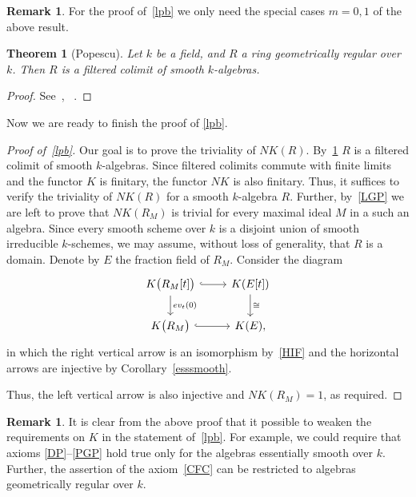 \documentclass[oneside, 11pt]{amsart} \pdfoutput=1
\numberwithin{equation}{section}
\newtheorem{theorem}[lemma]{Theorem}
\theoremstyle{definition}
\newtheorem{rem}[lemma]{Remark}
\begin{document}
\begin{rem}
For the proof of~\cref{lpb} we only need the special cases $m=0,1$ of the above result.
\end{rem}

\begin{theorem}[Popescu]
\label{popescu} Let $k$ be a field, and $R$ a ring geometrically regular over $k$. Then $R$ is a filtered colimit of smooth $k$-algebras. \end{theorem}
\begin{proof} See~\cite{Po85}, ~\cite[Theorem~1.1]{Sw98}.
\end{proof}

Now we are ready to finish the proof of \cref{lpb}. %
\begin{proof}[Proof of~\cref{lpb}]
Our goal is to prove the triviality of $NK(R)$.
By~\cref{popescu} $R$ is a filtered colimit of smooth $k$-algebras.
Since filtered colimits commute with finite limits and the functor $K$ is finitary, the functor $NK$ is also finitary.
Thus, it suffices to verify the triviality of $NK(R)$ for a smooth $k$-algebra $R$.
Further, by~\cref{LGP} we are left to prove that $NK(R_M)$ is trivial for every maximal ideal $M$ in a such an algebra.
Since every smooth scheme over $k$ is a disjoint union of smooth irreducible $k$-schemes, we may assume, without loss of generality, that $R$ is a domain.
Denote by $E$ the fraction field of $R_M$. Consider the diagram
\[\begin{tikzcd}
K\bigl(R_M[t]\bigr) \ar[hookrightarrow]{r} \ar{d}{ev_t(0)} & K(E[t]) \ar{d}{\cong}\\
K\bigl(R_M\bigr) \ar[hookrightarrow]{r} & K(E),
\end{tikzcd}\]
in which the right vertical arrow is an isomorphism by~\ref{HIF} and the horizontal arrows are injective by Corollary~\ref{esssmooth}.

Thus, the left vertical arrow is also injective and $NK(R_M) = 1$, as required.
\end{proof}
\begin{rem}\label{rem:relax}
It is clear from the above proof that it possible to weaken the requirements on $K$ in the statement of~\cref{lpb}. For example, we could require that axioms \ref{DP}--\ref{PGP} hold true only for the algebras essentially smooth over $k$. Further, the assertion of the axiom~\ref{CFC} can be restricted to algebras geometrically regular over $k$.
\end{rem}
\end{document}
